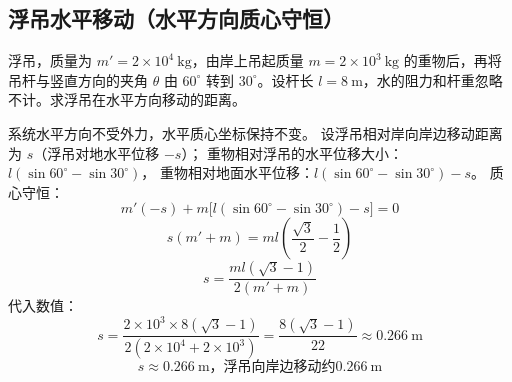 \subsection{浮吊水平移动（水平方向质心守恒）}
浮吊，质量为 $m'=2\times 10^4\ \mathrm{kg}$，由岸上吊起质量 $m=2\times 10^3\ \mathrm{kg}$ 的重物后，再将吊杆与竖直方向的夹角 $\theta$ 由 $60^\circ$ 转到 $30^\circ$。设杆长 $l=8\ \mathrm{m}$，水的阻力和杆重忽略不计。求浮吊在水平方向移动的距离。
\begin{solution}
系统水平方向不受外力，水平质心坐标保持不变。
设浮吊相对岸向岸边移动距离为 $s$（浮吊对地水平位移 $-s$）；
重物相对浮吊的水平位移大小：$l(\sin60^\circ-\sin30^\circ)$，
重物相对地面水平位移：$l(\sin60^\circ-\sin30^\circ)-s$。
质心守恒：
\[
m'(-s)+m\big[l(\sin60^\circ-\sin30^\circ)-s\big]=0
\]
\[
s(m'+m)=ml\left(\frac{\sqrt{3}}{2}-\frac12\right)
\]
\[
s = \frac{ml(\sqrt{3}-1)}{2(m'+m)}
\]
代入数值：
\[
s=\frac{2\times10^3 \times 8 (\sqrt{3}-1)}{2(2\times10^4+2\times10^3)}
=\frac{8(\sqrt{3}-1)}{22}\approx 0.266\ \mathrm{m}
\]
\[
\boxed{s\approx 0.266\ \mathrm{m}，浮吊向岸边移动约0.266\ \mathrm{m}}
\]
\end{solution}
